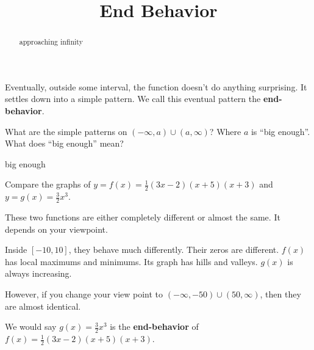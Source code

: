 \documentclass{ximera}
\title{End Behavior}
\begin{document}
\begin{abstract}
approaching infinity
\end{abstract}
\maketitle







Eventually, outside some interval, the function doesn't do anything surprising.  It settles down into a simple pattern.  We call this eventual pattern the \textbf{\textcolor{purple!85!blue}{end-behavior}}.



What are the simple patterns on $(-\infty, a) \cup (a, \infty)$?  Where $a$ is ``big enough''.  What does ``big enough'' mean?




\begin{example} big enough





Compare the graphs of $y = f(x) = \frac{1}{2}(3x-2)(x+5)(x+3)$ and $y=g(x) = \frac{3}{2}x^3$.



\begin{center}
\end{center}







\begin{center}
\end{center}







These two functions are either completely different or almost the same.  It depends on your viewpoint.

Inside $[-10, 10]$, they behave much differently. Their zeros are different.  $f(x)$ has local maximums and minimums.  Its graph has hills and valleys.  $g(x)$ is always increasing.

However, if you change your view point to $(-\infty, -50) \cup (50, \infty)$, then they are almost identical.


We would say $g(x) = \frac{3}{2}x^3$ is the \textbf{end-behavior} of $f(x) = \frac{1}{2}(3x-2)(x+5)(x+3)$.






\end{example}
\end{document}
